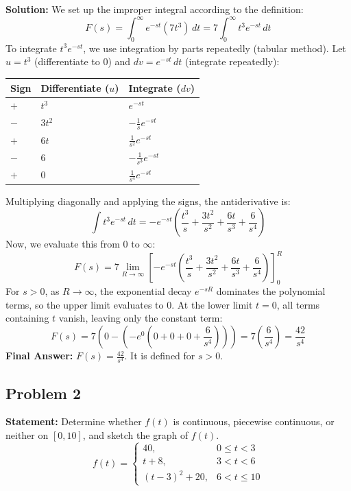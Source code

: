 \documentclass[11pt, a4paper]{article}
\theoremstyle{definition}
\theoremstyle{remark}
\begin{document}
\textbf{Solution:}
We set up the improper integral according to the definition:
\[
F(s) = \int_{0}^{\infty} e^{-st} (7t^3) \, dt = 7 \int_{0}^{\infty} t^3 e^{-st} \, dt
\]
To integrate $t^3 e^{-st}$, we use integration by parts repeatedly (tabular method). 
Let $u = t^3$ (differentiate to $0$) and $dv = e^{-st} \, dt$ (integrate repeatedly):
\renewcommand{\arraystretch}{1.5}
\begin{center}
\begin{tabularx}{0.6\textwidth}{>{\centering\arraybackslash}X >{\centering\arraybackslash}X >{\centering\arraybackslash}X}
\toprule
\textbf{Sign} & \textbf{Differentiate ($u$)} & \textbf{Integrate ($dv$)} \\
\midrule
$+$ & $t^3$ & $e^{-st}$ \\
$-$ & $3t^2$ & $-\frac{1}{s} e^{-st}$ \\
$+$ & $6t$ & $\frac{1}{s^2} e^{-st}$ \\
$-$ & $6$ & $-\frac{1}{s^3} e^{-st}$ \\
$+$ & $0$ & $\frac{1}{s^4} e^{-st}$ \\
\bottomrule
\end{tabularx}
\end{center}

Multiplying diagonally and applying the signs, the antiderivative is:
\[
\int t^3 e^{-st} \, dt = -e^{-st} \left( \frac{t^3}{s} + \frac{3t^2}{s^2} + \frac{6t}{s^3} + \frac{6}{s^4} \right)
\]
Now, we evaluate this from $0$ to $\infty$:
\[
F(s) = 7 \lim_{R \to \infty} \left[ -e^{-st} \left( \frac{t^3}{s} + \frac{3t^2}{s^2} + \frac{6t}{s^3} + \frac{6}{s^4} \right) \right]_{0}^{R}
\]
For $s > 0$, as $R \to \infty$, the exponential decay $e^{-sR}$ dominates the polynomial terms, so the upper limit evaluates to $0$. 
At the lower limit $t = 0$, all terms containing $t$ vanish, leaving only the constant term:
\[
F(s) = 7 \left( 0 - \left( -e^{0} \left( 0 + 0 + 0 + \frac{6}{s^4} \right) \right) \right) = 7 \left( \frac{6}{s^4} \right) = \frac{42}{s^4}
\]
\textbf{Final Answer:} $F(s) = \frac{42}{s^4}$. It is defined for $s > 0$.

\vspace{1em}
\subsection{Problem 2}
\textbf{Statement:} Determine whether $f(t)$ is continuous, piecewise continuous, or neither on $[0,10]$, and sketch the graph of $f(t)$.
\[
f(t) = 
\begin{cases} 
40, & 0 \le t < 3 \\ 
t + 8, & 3 < t < 6 \\ 
(t - 3)^2 + 20, & 6 < t \le 10 
\end{cases}
\]
\end{document}
